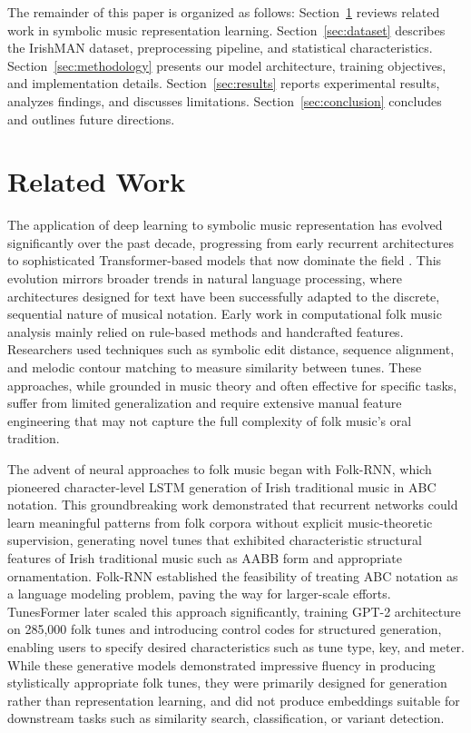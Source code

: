 \documentclass[]{interact}
\theoremstyle{plain}
\theoremstyle{definition}
\theoremstyle{remark}
\begin{document}
The remainder of this paper is organized as follows: Section~\ref{sec:related} reviews related work in symbolic music representation learning. Section~\ref{sec:dataset} describes the IrishMAN dataset, preprocessing pipeline, and statistical characteristics. Section~\ref{sec:methodology} presents our model architecture, training objectives, and implementation details. Section~\ref{sec:results} reports experimental results, analyzes findings, and discusses limitations. Section~\ref{sec:conclusion} concludes and outlines future directions.


\section{Related Work}\label{sec:related}

The application of deep learning to symbolic music representation has evolved significantly over the past decade, progressing from early recurrent architectures to sophisticated Transformer-based models that now dominate the field \cite{ferreira2023generating,ji2023survey}. This evolution mirrors broader trends in natural language processing, where architectures designed for text have been successfully adapted to the discrete, sequential nature of musical notation. Early work in computational folk music analysis mainly relied on rule-based methods and handcrafted features. Researchers used techniques such as symbolic edit distance, sequence alignment, and melodic contour matching to measure similarity between tunes\cite{typke2021survey}. These approaches, while grounded in music theory and often effective for specific tasks, suffer from limited generalization and require extensive manual feature engineering that may not capture the full complexity of folk music's oral tradition.

The advent of neural approaches to folk music began with Folk-RNN\cite{sturm2016music}, which pioneered character-level LSTM generation of Irish traditional music in ABC notation. This groundbreaking work demonstrated that recurrent networks could learn meaningful patterns from folk corpora without explicit music-theoretic supervision, generating novel tunes that exhibited characteristic structural features of Irish traditional music such as AABB form and appropriate ornamentation. Folk-RNN established the feasibility of treating ABC notation as a language modeling problem, paving the way for larger-scale efforts. TunesFormer\cite{wu2023tunesformer} later scaled this approach significantly, training GPT-2 architecture on 285,000 folk tunes and introducing control codes for structured generation, enabling users to specify desired characteristics such as tune type, key, and meter. While these generative models demonstrated impressive fluency in producing stylistically appropriate folk tunes, they were primarily designed for generation rather than representation learning, and did not produce embeddings suitable for downstream tasks such as similarity search, classification, or variant detection.
\end{document}
